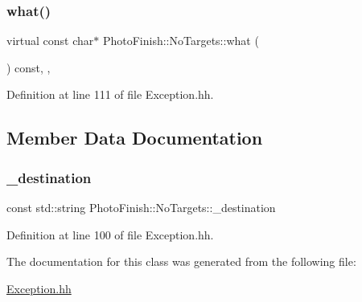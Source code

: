\subsubsection{\texorpdfstring{what()}{what()}}
{\footnotesize\ttfamily virtual const char$\ast$ Photo\+Finish\+::\+No\+Targets\+::what (\begin{DoxyParamCaption}{ }\end{DoxyParamCaption}) const\hspace{0.3cm}{\ttfamily [inline]}, {\ttfamily [virtual]}, {\ttfamily [noexcept]}}



Definition at line 111 of file Exception.\+hh.



\subsection{Member Data Documentation}
\mbox{\label{class_photo_finish_1_1_no_targets_a8320b51faa0efc71832f49ed13958ce7}} 
\subsubsection{\texorpdfstring{\+\_\+destination}{\_destination}}
{\footnotesize\ttfamily const std\+::string Photo\+Finish\+::\+No\+Targets\+::\+\_\+destination\hspace{0.3cm}{\ttfamily [protected]}}



Definition at line 100 of file Exception.\+hh.



The documentation for this class was generated from the following file\+:\begin{DoxyCompactItemize}
\item 
\hyperlink{_exception_8hh}{Exception.\+hh}\end{DoxyCompactItemize}
